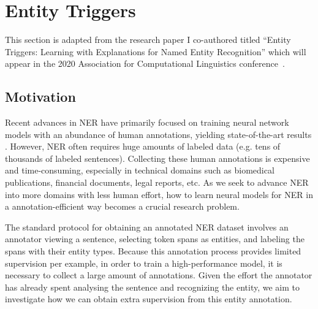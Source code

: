 \chapter{Entity Triggers}
This section is adapted from the research paper I co-authored titled ``Entity Triggers: Learning with Explanations for Named Entity Recognition'' which will appear in the 2020 Association for Computational Linguistics conference~\citep{TriggerNER}.



\section{Motivation}
\label{sec:intro}
Recent advances in NER have primarily focused on training neural network models with an abundance of human annotations, yielding state-of-the-art results \citep{LampleNER}. However, NER often requires huge amounts of labeled data (e.g. tens of thousands of labeled sentences). Collecting these human annotations is expensive and time-consuming, especially in technical domains such as biomedical publications, financial documents, legal reports, etc. As we seek to advance NER into more domains with less human effort, how to learn neural models for NER in a annotation-efficient way becomes a crucial research problem.

The standard protocol for obtaining an annotated NER dataset involves an annotator viewing a sentence, selecting token spans as entities, and labeling the spans with their entity types. Because this annotation process provides limited supervision per example, in order to train a high-performance model, it is necessary to collect a large amount of annotations. Given the effort the annotator has already spent analysing the sentence and recognizing the entity, we aim to investigate how we can obtain extra supervision from this entity annotation.

